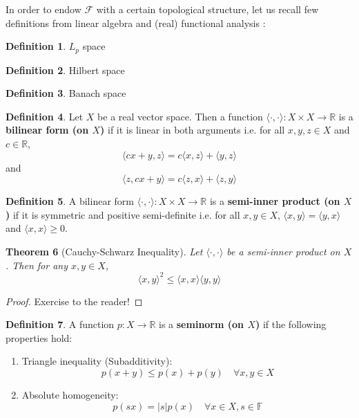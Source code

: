 \documentclass{article}
\theoremstyle{plain}
\newtheorem{theorem}{Theorem}
\theoremstyle{definition}
\newtheorem{definition}[theorem]{Definition}
\theoremstyle{remark}
\begin{document}
In order to endow $\mathcal{F}$ with a certain topological structure, let us recall few definitions from linear algebra \cite{HoffKun} and (real) functional analysis \cite{Rudin}:

\begin{definition}
	$L_p$ space
\end{definition}
\begin{definition}
	Hilbert space
\end{definition}
\begin{definition}
	Banach space
\end{definition}

\begin{definition}
	Let $X$ be a real vector space.
	Then a function $\langle \cdot, \cdot \rangle : X \times X \rightarrow \mathbb{R}$ is a {\bf bilinear form (on $X$)} if it is linear in both arguments i.e. for all $x, y, z \in X$ and $c \in \mathbb{R}$,
	\begin{equation*}
		\langle cx + y, z \rangle = c \langle x, z \rangle + \langle y, z \rangle
	\end{equation*}
	and
	\begin{equation*}
		\langle z, cx + y \rangle = c \langle z, x \rangle + \langle z, y \rangle
	\end{equation*}
\end{definition}

\begin{definition}
	A bilinear form $\langle \cdot, \cdot \rangle : X \times X \rightarrow \mathbb{R}$ is a {\bf semi-inner product (on $X$)} if it is symmetric and positive semi-definite i.e. for all $x, y \in X$, $\langle x, y \rangle = \langle y, x \rangle$ and $\langle x, x \rangle \geq 0$.
\end{definition}

\begin{theorem}[Cauchy-Schwarz Inequality]
	Let $\langle \cdot, \cdot \rangle$ be a semi-inner product on $X$.
	Then for any $x, y \in X$,
	\begin{equation*}
		\langle x, y \rangle^2 \leq \langle x, x \rangle \langle y, y \rangle
	\end{equation*}
\end{theorem}
\begin{proof}
	Exercise to the reader!
\end{proof}

\begin{definition}
	A function $p: X \rightarrow \mathbb{R}$ is a {\bf seminorm (on $X$)} if the following properties hold:
	\begin{enumerate}
		\item Triangle inequality (Subadditivity):
		\[ p(x + y) \leq p(x) + p(y) \quad \forall x, y \in X \]
		
		\item Absolute homogeneity:
		\[ p(sx) = |s| p(x) \quad \forall x \in X, s \in \mathbb{F} \]
	\end{enumerate}
\end{definition}
\end{document}
